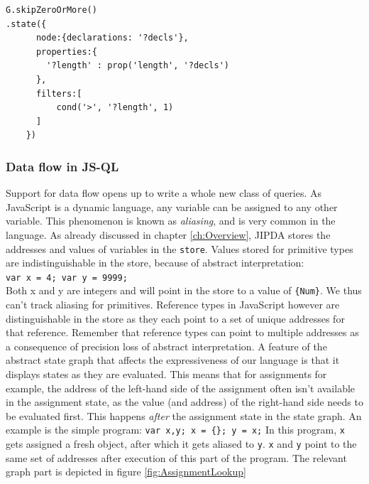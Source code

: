 \begin{lstlisting}[label={lst:multipleDeclarations},language=JSQL, caption=Filtering for multiple declarations,mathescape=true]
G.skipZeroOrMore()
.state({
      node:{declarations: '?decls'},
      properties:{
        '?length' : prop('length', '?decls')
      },
      filters:[
          cond('>', '?length', 1)
      ]
    }) 
\end{lstlisting}

\subsubsection{Data flow in JS-QL}

Support for data flow opens up to write a whole new class of queries. As JavaScript is a dynamic language, any variable can be assigned to any other variable. This phenomenon is known as \textit{aliasing}, and is very common in the language. As already discussed in chapter \ref{ch:Overview}, JIPDA stores the addresses and values of variables in the \texttt{store}. Values stored for primitive types are indistinguishable in the store, because of abstract interpretation:\\
\texttt{var x = 4; var y = 9999;}\\
Both x and y are integers and will point in the store to a value of \texttt{\{Num\}}. We thus can't track aliasing for primitives. Reference types in JavaScript however are distinguishable in the store as they each point to a set of unique addresses for that reference. Remember that reference types can point to multiple addresses as a consequence of precision loss of abstract interpretation. A feature of the abstract state graph that affects the expressiveness of our language is that it displays states as they are evaluated. This means that for assignments for example, the address of the left-hand side of the assignment often isn't available in the assignment state, as the value (and address) of the right-hand side needs to be evaluated first. This happens \textit{after} the assignment state in the state graph. An example is the simple program: 
\texttt{var x,y; x = \{\}; y = x;}
In this program, \texttt{x} gets assigned a fresh object, after which it gets aliased to \texttt{y}. \texttt{x} and \texttt{y} point to the same set of addresses after execution of this part of the program.
The relevant graph part is depicted in figure \ref{fig:AssignmentLookup}

